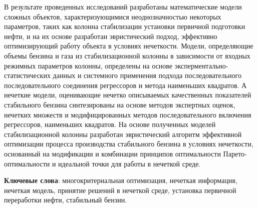 В результате проведенных исследований разработаны математические модели
сложных объектов, характеризующимися неоднозначностью некоторых
параметров, таких как колонна стабилизации установки первичной
подготовки нефти, и на их основе разработан эвристический подход,
эффективно оптимизирующий работу объекта в условиях нечеткости. Модели,
определяющие объемы бензина и газа из стабилизационной колонны в
зависимости от входных режимных параметров колонны, определены на основе
эксперментально-статистических данных и системного применения подхода
последовательного последовательного соединения регрессоров и метода
наименьших квадратов. А нечеткие модели, оценивающие нечетко описываемых
качественных показателей стабильного бензина синтезированы на основе
методов экспертных оценок, нечетких множеств и модифицированных методов
последовательного включения регрессоров, наименьших квадратов. На основе
полученных моделей стабилизационной колонны разработан эвристический
алгоритм эффективной оптимизации процесса производства стабильного
бензина в условиях нечеткости, основанный на модификации и комбинации
принципов оптимальности Парето-оптимальности и идеальной точки для
работы в нечеткой среде.

{\bfseries Ключевые слова}: многокритериальная оптимизация, нечеткая
информация, нечеткая модель, принятие решений в нечеткой среде,
установка первичной переработки нефти, стабильный бензин.

